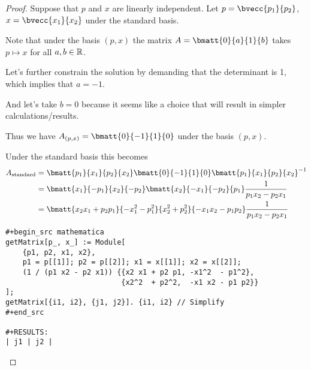 \documentclass[12pt]{article}
\begin{document}
\begin{proof}
  Suppose that $p$ and $x$ are linearly independent. Let $p = \bvecc{p_1}{p_2}$,
  $x = \bvecc{x_1}{x_2}$ under the standard basis.

  Note that under the basis $(p, x)$ the matrix $A = \bmatt{0}{a}
                                                           {1}{b}$ takes $p \mapsto x$ for
  all $a, b \in \mathbb{R}$.

  Let's further constrain the solution by demanding that the determinant is 1, which implies that $a = -1$.

  And let's take $b = 0$ because it seems like a choice that will result in simpler calculations/results.

  Thus we have $A_{(p,x)} = \bmatt{0}{-1}
                                 {1}{0}$ under the basis $(p, x)$.

  Under the standard basis this becomes
  \begin{align*}
    A_{\text{standard}}
    &=
      \bmatt{p_1}{x_1}
            {p_2}{x_2}
      \bmatt{0}{-1}
            {1}{0}
      \bmatt{p_1}{x_1}
            {p_2}{x_2}^{-1}\\
    &=
      \bmatt{x_1}{-p_1}
            {x_2}{-p_2}
      \bmatt{x_2}{-x_1}
            {-p_2}{p_1}
      \frac{1}{p_1x_2 - p_2x_1}\\
    &=
      \bmatt{x_2x_1 + p_2p_1}{-x_1^2 -p_1^2}
            {x_2^2 + p_2^2}{-x_1x_2 - p_1p_2}
      \frac{1}{p_1x_2 - p_2x_1}\\
  \end{align*}




\begin{verbatim}
#+begin_src mathematica
getMatrix[p_, x_] := Module[
    {p1, p2, x1, x2},
    p1 = p[[1]]; p2 = p[[2]]; x1 = x[[1]]; x2 = x[[2]];
    (1 / (p1 x2 - p2 x1)) {{x2 x1 + p2 p1, -x1^2  - p1^2},
                           {x2^2  + p2^2,  -x1 x2 - p1 p2}}
];
getMatrix[{i1, i2}, {j1, j2}]. {i1, i2} // Simplify
#+end_src

#+RESULTS:
| j1 | j2 |
\end{verbatim}


\end{proof}
\end{document}
